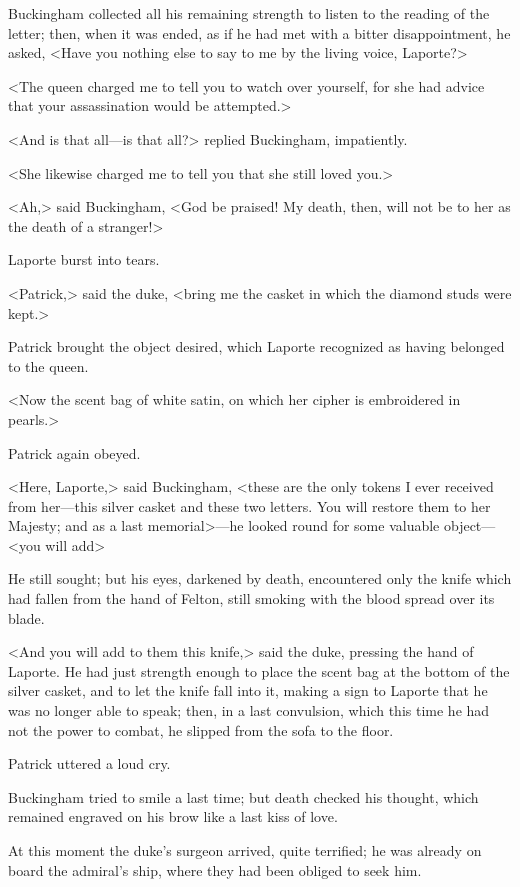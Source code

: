 Buckingham collected all his remaining strength to listen to the reading of the letter; then, when it was ended, as if he had met with a bitter disappointment, he asked, <Have you nothing else to say to me by the living voice, Laporte?> 

<The queen charged me to tell you to watch over yourself, for she had advice that your assassination would be attempted.> 

<And is that all---is that all?> replied Buckingham, impatiently. 

<She likewise charged me to tell you that she still loved you.> 

<Ah,> said Buckingham, <God be praised! My death, then, will not be to her as the death of a stranger!> 

Laporte burst into tears. 

<Patrick,> said the duke, <bring me the casket in which the diamond studs were kept.> 

Patrick brought the object desired, which Laporte recognized as having belonged to the queen. 

<Now the scent bag of white satin, on which her cipher is embroidered in pearls.> 

Patrick again obeyed. 

<Here, Laporte,> said Buckingham, <these are the only tokens I ever received from her---this silver casket and these two letters. You will restore them to her Majesty; and as a last memorial>---he looked round for some valuable object---<you will add\longdash> 

He still sought; but his eyes, darkened by death, encountered only the knife which had fallen from the hand of Felton, still smoking with the blood spread over its blade. 

<And you will add to them this knife,> said the duke, pressing the hand of Laporte. He had just strength enough to place the scent bag at the bottom of the silver casket, and to let the knife fall into it, making a sign to Laporte that he was no longer able to speak; then, in a last convulsion, which this time he had not the power to combat, he slipped from the sofa to the floor. 

Patrick uttered a loud cry. 

Buckingham tried to smile a last time; but death checked his thought, which remained engraved on his brow like a last kiss of love. 

At this moment the duke's surgeon arrived, quite terrified; he was already on board the admiral's ship, where they had been obliged to seek him. 


